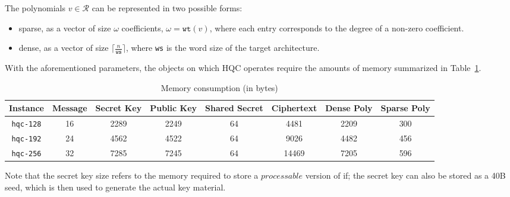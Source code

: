 		The polynomials $v \in \mathcal{R}$ can be represented in two possible forms:
		\begin{itemize}
			\item sparse, as a vector of size $\omega$ coefficients, $\omega = \texttt{wt}(v)$, where each entry corresponds to the degree of a non-zero coefficient.
			\item dense, as a vector of size $\lceil \frac{n}{\texttt{ws}} \rceil$, where \texttt{ws} is the word size of the target architecture.
		\end{itemize}
		With the aforementioned parameters, the objects on which HQC operates require the amounts of memory summarized in Table~\ref{tab:memory}.
		\begin{table}[ht]\small
			\centering
			\caption{Memory consumption (in bytes)}
			\label{tab:memory}
			\begin{tabular}{c|c|c|c|c|c|c|c}
				Instance & Message & Secret Key & Public Key & Shared Secret & Ciphertext & Dense Poly & Sparse Poly \\
				\hline 
				\texttt{hqc-128} & 16 & 2289 & 2249 & 64 & 4481 & 2209 & 300\\
				\hline
				\texttt{hqc-192} & 24 & 4562 & 4522 & 64 & 9026 & 4482 & 456\\
				\hline
				\texttt{hqc-256} & 32 & 7285 & 7245 & 64 & 14469 & 7205 & 596\\
			\end{tabular}
		\end{table}

		Note that the secret key size refers to the memory required to store a $\textit{processable}$ version of if; the
		secret key can also be stored as a 40B seed, which is then used to generate the actual key material.

